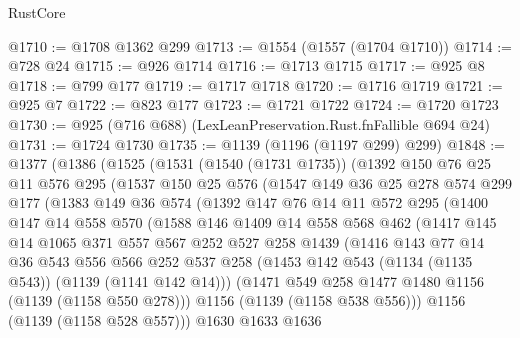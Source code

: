 \begin{lexlean}{RustCore}
\begin{coremodule}
@1710 := @1708 @1362 @299
@1713 := @1554 (@1557 (@1704 @1710))
@1714 := @728 @24
@1715 := @926 @1714
@1716 := @1713 @1715
@1717 := @925 @8
@1718 := @799 @177
@1719 := @1717 @1718
@1720 := @1716 @1719
@1721 := @925 @7
@1722 := @823 @177
@1723 := @1721 @1722
@1724 := @1720 @1723
@1730 := @925 (@716 @688) (LexLeanPreservation.Rust.fnFallible @694 @24)
@1731 := @1724 @1730
@1735 := @1139 (@1196 (@1197 @299) @299)
@1848 := @1377
    (@1386
      (@1525
        (@1531
          (@1540 (@1731 @1735))
          (@1392
            @150
            @76
            @25
            @11
            @576
            @295
            (@1537
              @150
              @25
              @576
              (@1547
                @149
                @36
                @25
                @278
                @574
                @299
                @177
                (@1383
                  @149
                  @36
                  @574
                  (@1392
                    @147
                    @76
                    @14
                    @11
                    @572
                    @295
                    (@1400
                      @147
                      @14
                      @558
                      @570
                      (@1588
                        @146
                        @1409
                        @14
                        @558
                        @568
                        @462
                        (@1417
                          @145
                          @14
                          @1065
                          @371
                          @557
                          @567
                          @252
                          @527
                          @258
                          @1439
                          (@1416
                            @143
                            @77
                            @14
                            @36
                            @543
                            @556
                            @566
                            @252
                            @537
                            @258
                            (@1453 @142 @543 (@1134 (@1135 @543)) (@1139 (@1141 @142 @14)))
                            (@1471 @549 @258 @1477 @1480 @1156 (@1139 (@1158 @550 @278)))
                            @1156
                            (@1139 (@1158 @538 @556)))
                          @1156
                          (@1139 (@1158 @528 @557)))
                        @1630
                        @1633
                        @1636

\end{coremodule}
\end{lexlean}
